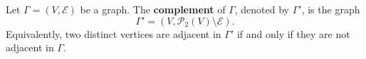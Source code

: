 Let $\Gamma = (V, \mathcal{E})$ be a graph. The \textbf{complement} of $\Gamma$, denoted by $\Gamma'$, is the graph
$$\Gamma' = (V, \mathcal{P}_2(V) \setminus \mathcal{E}).$$
Equivalently, two distinct vertices are adjacent in $\Gamma'$ if and only if they are not adjacent in $\Gamma$.
